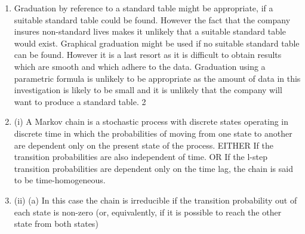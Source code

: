 \documentclass[a4paper,12pt]{article}
\begin{document}
\begin{enumerate}

\item %
Graduation by reference to a standard table might be appropriate, if a suitable standard table could be found.
However the fact that the company insures non-standard lives makes it unlikely that a suitable standard table would exist.
Graphical graduation might be used if no suitable standard table can be found.
However it is a last resort as it is difficult to obtain results which are smooth and which adhere to the data.
Graduation using a parametric formula is unlikely to be appropriate as the amount of data in this investigation is likely to be small and it is unlikely that the company will
want to produce a standard table.
2
\item (i)
A Markov chain is a stochastic process with discrete states operating in discrete time in which the probabilities of moving from one state to another
are dependent only on the present state of the process.
EITHER
If the transition probabilities are also independent of time.
OR
If the l-step transition probabilities are dependent only on the time lag, the
chain is said to be time-homogeneous.
\item (ii)
(a)
In this case the chain is irreducible if the transition probability out of each state is non-zero (or, equivalently, if it is possible to
reach the other state from both states)


\end{enumerate}
\end{document}
